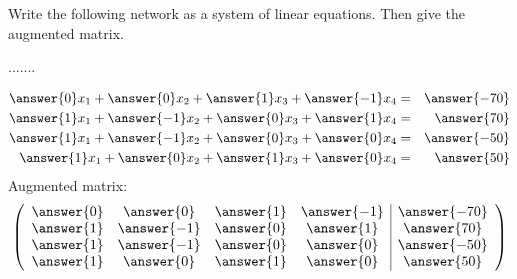 \documentclass{ximera}
\author{Parisa Fatheddin}
\begin{document}
\begin{exercise}
Write the following network as a system of linear equations. Then give the augmented matrix. 

.......\\

\begin{prompt}
\begin{eqnarray*}
\answer{0} x_{1} + \answer{0} x_{2} +\answer{1}x_{3} + \answer{-1}x_{4} &=& \answer{-70}\\
\answer{1} x_{1} + \answer{-1} x_{2} +\answer{0}x_{3} + \answer{1}x_{4} &=& \answer{70}\\
\answer{1} x_{1} + \answer{-1} x_{2} +\answer{0}x_{3} + \answer{0}x_{4} &=& \answer{-50}\\
\answer{1} x_{1} + \answer{0} x_{2} +\answer{1}x_{3} + \answer{0}x_{4} &=& \answer{50}
\end{eqnarray*}
Augmented matrix:
\[
\left(\begin{array}{cccc|c}
\answer{0} & \answer{0} & \answer{1} & \answer{-1}& \answer{-70}\\
\answer{1} & \answer{-1} & \answer{0} & \answer{1}& \answer{70}\\
\answer{1} & \answer{-1} & \answer{0} & \answer{0}& \answer{-50}\\
\answer{1} & \answer{0} & \answer{1} & \answer{0}& \answer{50}
\end{array}\right)\]
\end{prompt}







\end{exercise}
\end{document}
